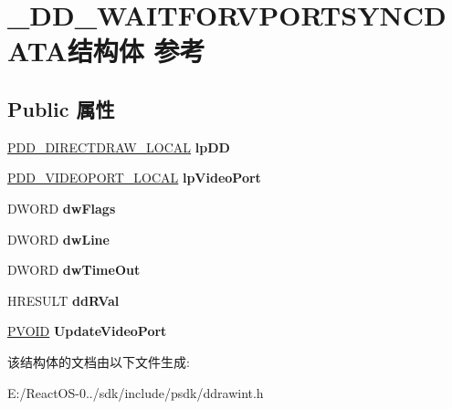 \hypertarget{struct___d_d___w_a_i_t_f_o_r_v_p_o_r_t_s_y_n_c_d_a_t_a}{}\section{\+\_\+\+D\+D\+\_\+\+W\+A\+I\+T\+F\+O\+R\+V\+P\+O\+R\+T\+S\+Y\+N\+C\+D\+A\+T\+A结构体 参考}
\label{struct___d_d___w_a_i_t_f_o_r_v_p_o_r_t_s_y_n_c_d_a_t_a}
\subsection*{Public 属性}
\begin{DoxyCompactItemize}
\item 
\mbox{\label{struct___d_d___w_a_i_t_f_o_r_v_p_o_r_t_s_y_n_c_d_a_t_a_a2f31a58d7992a5cfc1d8d9e357a92677}} 
\hyperlink{struct___d_d___d_i_r_e_c_t_d_r_a_w___l_o_c_a_l}{P\+D\+D\+\_\+\+D\+I\+R\+E\+C\+T\+D\+R\+A\+W\+\_\+\+L\+O\+C\+AL} {\bfseries lp\+DD}
\item 
\mbox{\label{struct___d_d___w_a_i_t_f_o_r_v_p_o_r_t_s_y_n_c_d_a_t_a_a31b6e79497cc5f91b7bc812829b7a3c5}} 
\hyperlink{struct___d_d___v_i_d_e_o_p_o_r_t___l_o_c_a_l}{P\+D\+D\+\_\+\+V\+I\+D\+E\+O\+P\+O\+R\+T\+\_\+\+L\+O\+C\+AL} {\bfseries lp\+Video\+Port}
\item 
\mbox{\label{struct___d_d___w_a_i_t_f_o_r_v_p_o_r_t_s_y_n_c_d_a_t_a_a66bb262ae5d22db358fff0347b846556}} 
D\+W\+O\+RD {\bfseries dw\+Flags}
\item 
\mbox{\label{struct___d_d___w_a_i_t_f_o_r_v_p_o_r_t_s_y_n_c_d_a_t_a_aee15e3b92eb6a59dba3c23dd27b09ec1}} 
D\+W\+O\+RD {\bfseries dw\+Line}
\item 
\mbox{\label{struct___d_d___w_a_i_t_f_o_r_v_p_o_r_t_s_y_n_c_d_a_t_a_a0436af09b537969410ab3b30f8e48dd1}} 
D\+W\+O\+RD {\bfseries dw\+Time\+Out}
\item 
\mbox{\label{struct___d_d___w_a_i_t_f_o_r_v_p_o_r_t_s_y_n_c_d_a_t_a_ad23029fa31751e89f6679496f0ad0846}} 
H\+R\+E\+S\+U\+LT {\bfseries dd\+R\+Val}
\item 
\mbox{\label{struct___d_d___w_a_i_t_f_o_r_v_p_o_r_t_s_y_n_c_d_a_t_a_a5724a0b0f9c8a6de6f5ddec07de37b9c}} 
\hyperlink{interfacevoid}{P\+V\+O\+ID} {\bfseries Update\+Video\+Port}
\end{DoxyCompactItemize}


该结构体的文档由以下文件生成\+:\begin{DoxyCompactItemize}
\item 
E\+:/\+React\+O\+S-\/0../sdk/include/psdk/ddrawint.\+h\end{DoxyCompactItemize}
